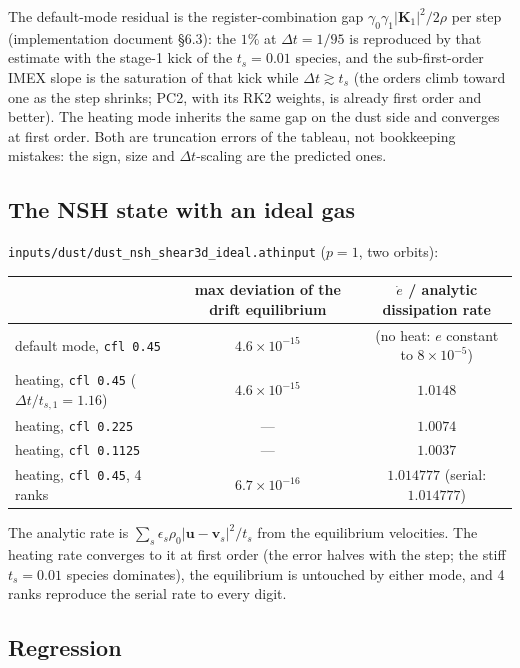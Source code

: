\documentclass[11pt]{article}
\newcommand{\code}[1]{\texttt{#1}}
\newcommand{\file}[1]{\texttt{#1}}
\begin{document}
The default-mode residual is the register-combination gap
$\gamma_0\gamma_1|\mathbf K_1|^2/2\rho$ per step (implementation document \S6.3): the
$1\%$ at $\Delta t = 1/95$ is reproduced by that estimate with the stage-1 kick of the
$t_s = 0.01$ species, and the sub-first-order IMEX slope is the saturation of that kick
while $\Delta t \gtrsim t_s$ (the orders climb toward one as the step shrinks; PC2,
with its RK2 weights, is already first order and better). The heating mode inherits
the same gap on the dust side and converges at first order. Both are truncation
errors of the tableau, not bookkeeping mistakes: the sign, size and $\Delta t$-scaling
are the predicted ones.

\subsection{The NSH state with an ideal gas}

\file{inputs/dust/dust\_nsh\_shear3d\_ideal.athinput} ($p = 1$, two orbits):

\begin{center}
\small
\begin{tabular}{@{}lcc@{}}
\toprule
 & max deviation of the drift equilibrium & $\dot e$ / analytic dissipation rate \\
\midrule
default mode, \code{cfl 0.45} & $4.6\times10^{-15}$ & (no heat: $e$ constant to $8\times10^{-5}$) \\
heating, \code{cfl 0.45} ($\Delta t/t_{s,1} = 1.16$) & $4.6\times10^{-15}$ & $1.0148$ \\
heating, \code{cfl 0.225} & --- & $1.0074$ \\
heating, \code{cfl 0.1125} & --- & $1.0037$ \\
heating, \code{cfl 0.45}, 4 ranks & $6.7\times10^{-16}$ & $1.014777$ (serial: $1.014777$) \\
\bottomrule
\end{tabular}
\end{center}

The analytic rate is $\sum_s \epsilon_s\rho_0|\mathbf u - \mathbf v_s|^2/t_s$ from the
equilibrium velocities. The heating rate converges to it at first order (the error
halves with the step; the stiff $t_s = 0.01$ species dominates), the equilibrium is
untouched by either mode, and 4 ranks reproduce the serial rate to every digit.

\subsection{Regression}
\end{document}
